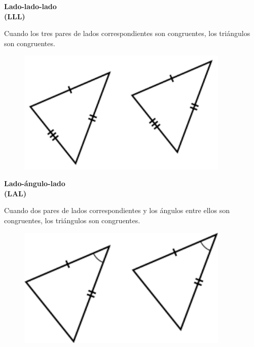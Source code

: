 \begin{tcbitemize}[raster columns=4, raster equal height=rows,
        size=small,colback=colorrds!5!white,
        colframe=colorrds!35!white,colbacktitle=colorrds!50!white,
        fonttitle=\centering\bfseries,title={Criterio \# \thetcbrasternum}]
    \tcbitem
    \begin{center}\bfseries
        Lado-lado-lado\\
        (LLL)
    \end{center}
    Cuando los tres pares de lados correspondientes son congruentes, los triángulos son congruentes.

    \begin{figure}[H]
        \centering
        \includegraphics[width=0.9\textwidth]{../images/criterioLLL}
        \caption{}
        \label{fig:criterioLLL}
    \end{figure}

    \tcbitem
    \begin{center}\bfseries
        Lado-ángulo-lado\\ (LAL)
    \end{center}
    Cuando dos pares de lados correspondientes y los ángulos entre ellos son congruentes, los triángulos son congruentes.

    \begin{figure}[H]
        \includegraphics[width=0.9\textwidth]{../images/criterioLAL}
        \caption{}
        \label{fig:criterioLAL}
    \end{figure}


\end{tcbitemize}

